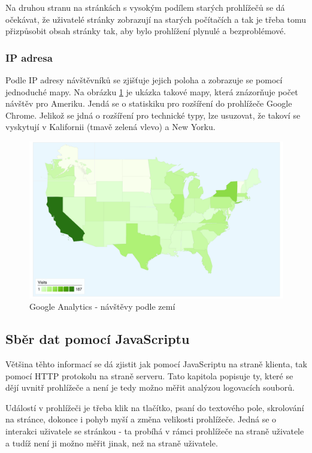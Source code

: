 \documentclass[bc,male,java,dept456]{diploma}						%
\begin{document}
Na druhou stranu na stránkách s vysokým podílem starých prohlížečů se dá očekávat, že uživatelé stránky zobrazují na starých počítačích a tak je třeba tomu přizpůsobit obsah stránky tak, aby bylo prohlížení plynulé a bezproblémové.

\subsubsection{IP adresa}

Podle IP adresy návštěvníků se zjišťuje jejich poloha a zobrazuje se pomocí jednoduché mapy. Na obrázku \ref{img:analytics-map} je ukázka takové mapy, která znázorňuje počet návštěv pro Ameriku. Jendá se o statiskiku pro rozšíření do prohlížeče Google Chrome. Jelikož se jdná o rozšíření pro technické typy, lze usuzovat, že takoví se vyskytují v Kalifornii (tmavě zelená vlevo) a New Yorku.

\begin{figure}[hp]
	\centering
	\includegraphics[width=14.25cm]{img/map-analytics.pdf}
	\caption{Google Analytics - návštěvy podle zemí}
	\label{img:analytics-map}
\end{figure}



\subsection{Sběr dat pomocí JavaScriptu}

Většina těhto informací se dá zjistit jak pomocí JavaScriptu na straně klienta, tak pomocí HTTP protokolu na straně serveru. Tato kapitola popisuje ty, které se dějí uvnitř prohlížeče a není je tedy možno měřit analýzou logovacích souborů.

Událostí v prohlížeči je třeba klik na tlačítko, psaní do textového pole, skrolování na stránce, dokonce i pohyb myší a změna velikosti prohlížeče. Jedná se o interakci uživatele se stránkou - ta probíhá v rámci prohlížeče na straně uživatele a tudíž není ji možno měřit jinak, než na straně uživatele.
\end{document}
